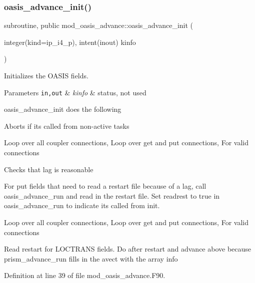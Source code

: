 \subsubsection{\texorpdfstring{oasis\+\_\+advance\+\_\+init()}{oasis\_advance\_init()}}
{\footnotesize\ttfamily subroutine, public mod\+\_\+oasis\+\_\+advance\+::oasis\+\_\+advance\+\_\+init (\begin{DoxyParamCaption}\item[{integer(kind=ip\+\_\+i4\+\_\+p), intent(inout)}]{kinfo }\end{DoxyParamCaption})}



Initializes the O\+A\+S\+IS fields. 


\begin{DoxyParams}[1]{Parameters}
\mbox{\tt in,out}  & {\em kinfo} & status, not used \\
\hline
\end{DoxyParams}
oasis\+\_\+advance\+\_\+init does the following
\begin{DoxyItemize}
\item Aborts if it\textquotesingle{}s called from non-\/active tasks
\item Loop over all coupler connections, Loop over get and put connections, For valid connections
\begin{DoxyItemize}
\item Checks that lag is reasonable
\item For put fields that need to read a restart file because of a lag, call oasis\+\_\+advance\+\_\+run and read in the restart file. Set readrest to true in oasis\+\_\+advance\+\_\+run to indicate it\textquotesingle{}s called from init.
\end{DoxyItemize}
\item Loop over all coupler connections, Loop over get and put connections, For valid connections
\begin{DoxyItemize}
\item Read restart for L\+O\+C\+T\+R\+A\+NS fields. Do after restart and advance above because prism\+\_\+advance\+\_\+run fills in the avect with the array info 
\end{DoxyItemize}
\end{DoxyItemize}

Definition at line 39 of file mod\+\_\+oasis\+\_\+advance.\+F90.

\mbox{\label{namespacemod__oasis__advance_a0514c843d051b8ee16adfb349eaee6a7}} 
